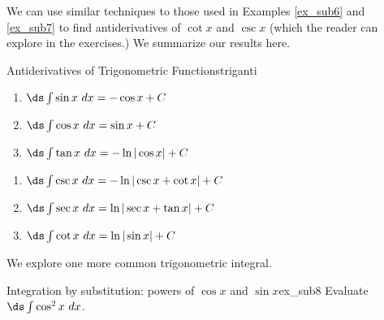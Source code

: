 

We can use similar techniques to those used in Examples \ref{ex_sub6} and \ref{ex_sub7} to find antiderivatives of $\cot x$ and $\csc x$ (which the reader can explore in the exercises.) We summarize our results here.

\begin{theorem}{Antiderivatives of Trigonometric Functions}{triganti}
{\begin{minipage}{.45\textwidth}\small{}
	\begin{enumerate}
	\item		$\ds \int \sin x \ dx = -\cos x +C$
	\item		$\ds\int \cos x\ dx = \sin x + C$
	\item		$\ds \int \tan x\ dx = -\ln|\cos x|+C$
\end{enumerate}
\end{minipage}
\begin{minipage}{.55\textwidth}\small
	\begin{enumerate}\addtocounter{enumi}{3}
	\item		$\ds \int \csc x \ dx = -\ln|\csc x+\cot x| +C$
	\item		$\ds\int \sec x\ dx = \ln|\sec x+\tan x| + C$
	\item		$\ds \int \cot x\ dx = \ln|\sin x|+C$
\end{enumerate}
\end{minipage}
}
\end{theorem}



We explore one more common trigonometric integral.\\

\begin{example}{Integration by substitution: powers of $\cos x$ and $\sin x$}{ex_sub8}
{
Evaluate $\ds \int \cos^2x\ dx$.}
\end{example}

